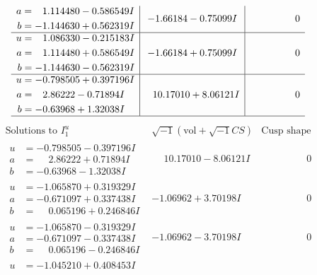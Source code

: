 \documentclass[1p]{elsarticle_modified}
\theoremstyle{definition}
\newcommand{\I}{\sqrt{-1}}
\begin{document}
$$\begin{array}{c|c|c}
\begin{aligned}
a &= \phantom{-}1.114480 - 0.586549 I \\
b &= -1.144630 + 0.562319 I\end{aligned}
 & -1.66184 - 0.75099 I & \phantom{-0.000000 } 0 \\ \hline\begin{aligned}
u &= \phantom{-}1.086330 - 0.215183 I \\
a &= \phantom{-}1.114480 + 0.586549 I \\
b &= -1.144630 - 0.562319 I\end{aligned}
 & -1.66184 + 0.75099 I & \phantom{-0.000000 } 0 \\ \hline\begin{aligned}
u &= -0.798505 + 0.397196 I \\
a &= \phantom{-}2.86222 - 0.71894 I \\
b &= -0.63968 + 1.32038 I\end{aligned}
 & \phantom{-}10.17010 + 8.06121 I & \phantom{-0.000000 } 0\\
 \hline 
 \end{array}$$\newpage$$\begin{array}{c|c|c}  
\text{Solutions to }I^u_{1}& \I (\text{vol} + \sqrt{-1}CS) & \text{Cusp shape}\\
 \hline 
\begin{aligned}
u &= -0.798505 - 0.397196 I \\
a &= \phantom{-}2.86222 + 0.71894 I \\
b &= -0.63968 - 1.32038 I\end{aligned}
 & \phantom{-}10.17010 - 8.06121 I & \phantom{-0.000000 } 0 \\ \hline\begin{aligned}
u &= -1.065870 + 0.319329 I \\
a &= -0.671097 + 0.337438 I \\
b &= \phantom{-}0.065196 + 0.246846 I\end{aligned}
 & -1.06962 + 3.70198 I & \phantom{-0.000000 } 0 \\ \hline\begin{aligned}
u &= -1.065870 - 0.319329 I \\
a &= -0.671097 - 0.337438 I \\
b &= \phantom{-}0.065196 - 0.246846 I\end{aligned}
 & -1.06962 - 3.70198 I & \phantom{-0.000000 } 0 \\ \hline\begin{aligned}
u &= -1.045210 + 0.408453 I \\

\end{aligned}
\end{array}$$
\end{document}
